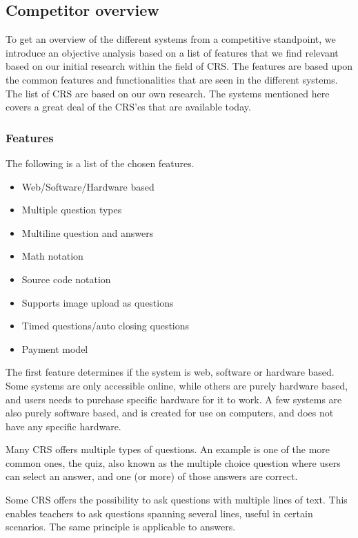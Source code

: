 \subsection{Competitor overview}\label{sec:competitor-overview}
To get an overview of the different systems from a competitive standpoint, we introduce an objective analysis based on a list of features that we find relevant based on our initial research within the field of CRS. The features are based upon the common features and functionalities that are seen in the different systems. The list of CRS are based on our own research. The systems mentioned here covers a great deal of the CRS'es that are available today.

\subsubsection*{Features}

The following is a list of the chosen features.

\begin{itemize}
    \item Web/Software/Hardware based
    \item Multiple question types
    \item Multiline question and answers
    \item Math notation
    \item Source code notation
    \item Supports image upload as questions
    \item Timed questions/auto closing questions
    \item Payment model
\end{itemize}

The first feature determines if the system is web, software or hardware based. Some systems are only accessible online, while others are purely hardware based, and users needs to purchase specific hardware for it to work. A few systems are also purely software based, and is created for use on computers, and does not have any specific hardware.

Many CRS offers multiple types of questions. An example is one of the more common ones, the quiz, also known as the multiple choice question where users can select an answer, and one (or more) of those answers are correct.

Some CRS offers the possibility to ask questions with multiple lines of text. This enables teachers to ask questions spanning several lines, useful in certain scenarios. The same principle is applicable to answers.

